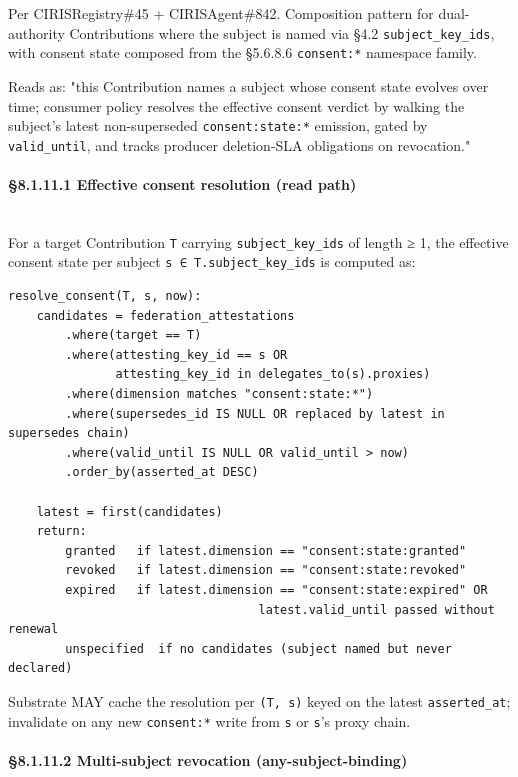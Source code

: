 \documentclass[10pt]{article}
\begin{document}
Per CIRISRegistry\#45 + CIRISAgent\#842. Composition pattern for dual-authority Contributions where the subject is named via §4.2 \texttt{subject\_key\_ids}, with consent state composed from the §5.6.8.6 \texttt{consent:*} namespace family.


Reads as: "this Contribution names a subject whose consent state evolves over time; consumer policy resolves the effective consent verdict by walking the subject's latest non-superseded \texttt{consent:state:*} emission, gated by \texttt{valid\_until}, and tracks producer deletion-SLA obligations on revocation."


\paragraph{§8.1.11.1 Effective consent resolution (read path)}\mbox{}\\


For a target Contribution \texttt{T} carrying \texttt{subject\_key\_ids} of length ≥ 1, the effective consent state per subject \texttt{s ∈ T.subject\_key\_ids} is computed as:


\begin{lstlisting}
resolve_consent(T, s, now):
    candidates = federation_attestations
        .where(target == T)
        .where(attesting_key_id == s OR
               attesting_key_id in delegates_to(s).proxies)
        .where(dimension matches "consent:state:*")
        .where(supersedes_id IS NULL OR replaced by latest in supersedes chain)
        .where(valid_until IS NULL OR valid_until > now)
        .order_by(asserted_at DESC)

    latest = first(candidates)
    return:
        granted   if latest.dimension == "consent:state:granted"
        revoked   if latest.dimension == "consent:state:revoked"
        expired   if latest.dimension == "consent:state:expired" OR
                                   latest.valid_until passed without renewal
        unspecified  if no candidates (subject named but never declared)
\end{lstlisting}

Substrate MAY cache the resolution per \texttt{(T, s)} keyed on the latest \texttt{asserted\_at}; invalidate on any new \texttt{consent:*} write from \texttt{s} or \texttt{s}'s proxy chain.


\paragraph{§8.1.11.2 Multi-subject revocation (any-subject-binding)}\mbox{}\\
\end{document}
